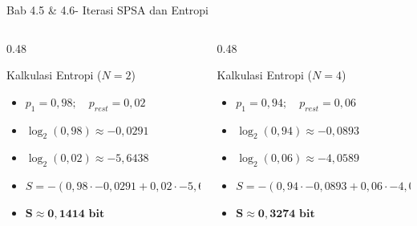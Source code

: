 \begin{frame}{Bab 4.5 \& 4.6- Iterasi SPSA dan Entropi}
    \begin{columns}[T]
        \begin{column}{0.48\textwidth}
            \begin{exampleblock}{Kalkulasi Entropi ($N=2$)}
                \scriptsize
                \begin{itemize}
                    \item $p_{1} = 0,98; \quad p_{rest} = 0,02$
                    \item $\log_2(0,98) \approx -0,0291$
                    \item $\log_2(0,02) \approx -5,6438$
                    \item $S = -(0,98 \cdot -0,0291 + 0,02 \cdot -5,6438)$
                    \item $\mathbf{S \approx 0,1414 \text{ bit}}$
                \end{itemize}
            \end{exampleblock}
        \end{column}
        \begin{column}{0.48\textwidth}
            \begin{exampleblock}{Kalkulasi Entropi ($N=4$)}
                \scriptsize
                \begin{itemize}
                    \item $p_{1} = 0,94; \quad p_{rest} = 0,06$
                    \item $\log_2(0,94) \approx -0,0893$
                    \item $\log_2(0,06) \approx -4,0589$
                    \item $S = -(0,94 \cdot -0,0893 + 0,06 \cdot -4,0589)$
                    \item $\mathbf{S \approx 0,3274 \text{ bit}}$
                \end{itemize}
            \end{exampleblock}
        \end{column}
    \end{columns}
\end{frame}

